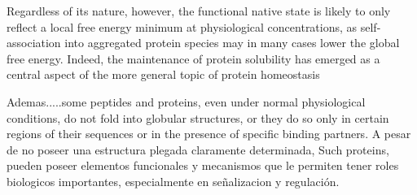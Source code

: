 Regardless of its nature, however, the functional native state is likely to only reflect a local free energy minimum at physiological concentrations, 
as self-association into aggregated protein species may in many cases lower the global free energy.
Indeed, the maintenance of protein solubility has emerged as a central aspect of the more general topic of protein homeostasis


Ademas.....some peptides and proteins, even under normal physiological conditions, do not fold into globular structures, or they do so only in certain regions of their sequences or in the presence of specific binding partners.
A pesar de no poseer una estructura plegada claramente determinada, Such proteins, pueden poseer elementos funcionales y mecanismos que le permiten tener roles biologicos importantes, especialmente en señalizacion y regulación.

